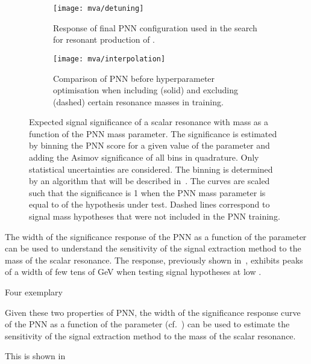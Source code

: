 \begin{figure}[htbp]
  \centering

  \begin{subfigure}[t]{.49\textwidth}
    \texttt{[image: mva/detuning]}
    \caption{Response of final PNN configuration used in the search
      for resonant production of \HH.}
    \label{fig:pnn_detuning}
  \end{subfigure}\hfill%
  \begin{subfigure}[t]{.49\textwidth}
    \centering
    \texttt{[image: mva/interpolation]}
    \caption{Comparison of PNN before hyperparameter optimisation when
      including (solid) and excluding (dashed) certain resonance
      masses in training.}
    \label{fig:pnn_interpolation}
  \end{subfigure}

  \caption{Expected signal significance of a scalar resonance with
    mass \mX as a function of the PNN mass parameter. The significance
    is estimated by binning the PNN score for a given value of the
    parameter and adding the Asimov significance of all bins in
    quadrature. Only statistical uncertainties are considered. The
    binning is determined by an algorithm that will be described
    in~. The curves are scaled such that the
    significance is 1 when the PNN mass parameter is equal to \mX of
    the hypothesis under test. Dashed lines correspond to signal mass
    hypotheses that were not included in the PNN training.}
  \label{fig:pnn_properties}
\end{figure}

The width of the significance response of the PNN as a function of the
parameter can be used to understand the sensitivity of the signal
extraction method to the mass of the scalar resonance. The response,
previously shown in~, exhibits peaks of a width
of few tens of \si{\GeV} when testing signal hypotheses at low
\mX.

Four exemplary

Given these two properties of PNN, the width of the significance
response curve of the PNN as a function of the parameter
(cf.~) can be used to estimate the
sensitivity of the signal extraction method to the mass of the scalar
resonance.

This is shown in~



